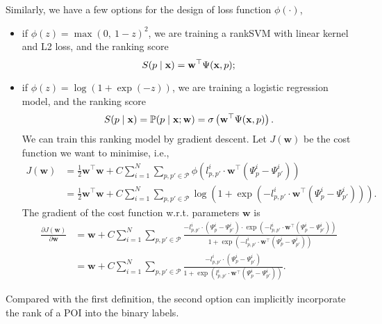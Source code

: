 Similarly, we have a few options for the design of loss function $\phi(\cdot)$,
\begin{itemize}
\item if $\phi(z) = \max(0,~ 1-z)^2$, we are training a rankSVM with linear kernel and L2 loss, and the ranking score 
      \begin{equation*}
      S(p \mid \mathbf{x})= \mathbf{w}^\top \Psi(\mathbf{x}, p);
      \end{equation*}
\item if $\phi(z) = \log(1 + \exp(-z))$, we are training a logistic regression model, and the ranking score
      \begin{equation*}
      S(p \mid \mathbf{x})= \mathbb{P}(p \mid \mathbf{x}; \mathbf{w}) = \sigma \left(\mathbf{w}^\top \Psi(\mathbf{x}, p) \right).
      \end{equation*}
      We can train this ranking model by gradient descent. Let $J(\mathbf{w})$ be the cost function we want to minimise, i.e.,
      \begin{align*}
      J(\mathbf{w})
      &= \frac{1}{2} \mathbf{w}^\top \mathbf{w} +  
         C \sum_{i=1}^N \sum_{p, p' \in \mathcal{P}} \phi \left( l_{p,p'}^i \cdot \mathbf{w}^\top (\Psi_p^i - \Psi_{p'}^i) \right) \\
      &= \frac{1}{2} \mathbf{w}^\top \mathbf{w} + 
         C \sum_{i=1}^N \sum_{p, p' \in \mathcal{P}} \log\left(1 + \exp\left(-l_{p,p'}^i \cdot \mathbf{w}^\top (\Psi_p^i - \Psi_{p'}^i) \right)\right).
      \end{align*}
      The gradient of the cost function w.r.t. parameters $\mathbf{w}$ is
      \begin{align*}
      \frac{\partial J(\mathbf{w})}{\partial \mathbf{w}} 
      &= \mathbf{w} + C \sum_{i=1}^N \sum_{p, p' \in \mathcal{P}} 
         \frac{-l_{p,p'}^i \cdot (\Psi_p^i - \Psi_{p'}^i) \cdot \exp\left( -l_{p,p'}^i \cdot \mathbf{w}^\top (\Psi_p^i - \Psi_{p'}^i) \right)}
              {1 + \exp\left( -l_{p,p'}^i \cdot \mathbf{w}^\top (\Psi_p^i - \Psi_{p'}^i) \right)} \\
      &= \mathbf{w} + C \sum_{i=1}^N \sum_{p, p' \in \mathcal{P}} 
         \frac{-l_{p,p'}^i \cdot (\Psi_p^i - \Psi_{p'}^i)}{1 + \exp\left( l_{p,p'}^i \cdot \mathbf{w}^\top (\Psi_p^i - \Psi_{p'}^i) \right)}.
      \end{align*} 
\end{itemize}

      
Compared with the first definition, the second option can implicitly incorporate the rank of a POI into the binary labels.



